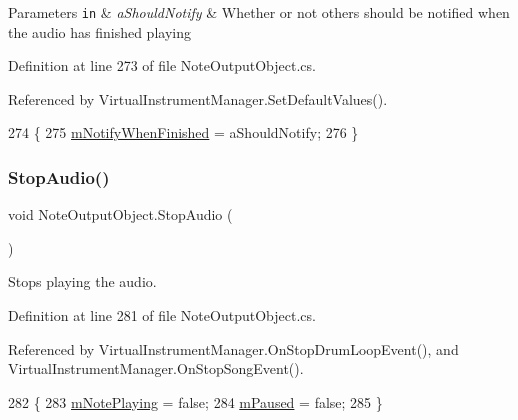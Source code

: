 \begin{DoxyParams}[1]{Parameters}
\mbox{\tt in}  & {\em a\+Should\+Notify} & Whether or not others should be notified when the audio has finished playing \\
\hline
\end{DoxyParams}


Definition at line 273 of file Note\+Output\+Object.\+cs.



Referenced by Virtual\+Instrument\+Manager.\+Set\+Default\+Values().


\begin{DoxyCode}
274     \{
275         \hyperlink{group___n_o_o_priv_var_gaf72dd5943487433966b20b973be1e8b3}{mNotifyWhenFinished} = aShouldNotify;
276     \}
\end{DoxyCode}
\mbox{\label{group___n_o_o_pub_func_gae8a8e5bc027fd0186464a68399a4fecb}} 
\subsubsection{\texorpdfstring{Stop\+Audio()}{StopAudio()}}
{\footnotesize\ttfamily void Note\+Output\+Object.\+Stop\+Audio (\begin{DoxyParamCaption}{ }\end{DoxyParamCaption})}



Stops playing the audio. 



Definition at line 281 of file Note\+Output\+Object.\+cs.



Referenced by Virtual\+Instrument\+Manager.\+On\+Stop\+Drum\+Loop\+Event(), and Virtual\+Instrument\+Manager.\+On\+Stop\+Song\+Event().


\begin{DoxyCode}
282     \{
283         \hyperlink{group___n_o_o_priv_var_ga4417170b8fa977f05a0b4cd0d16412fd}{mNotePlaying} = \textcolor{keyword}{false};
284         \hyperlink{group___n_o_o_priv_var_ga50fe6047e6a199215fc70b9fc78ac7eb}{mPaused} = \textcolor{keyword}{false};
285     \}
\end{DoxyCode}

